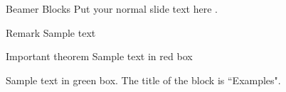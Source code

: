 \begin{frame}{Beamer Blocks}
  Put your normal slide text \alert{here} .

  \begin{block}{Remark}
    Sample text
  \end{block}

  \begin{alertblock}{Important theorem}
    Sample text in red box
  \end{alertblock}

  \begin{examples}
    Sample text in green box. The title of the block is ``Examples".
  \end{examples}
\end{frame}
